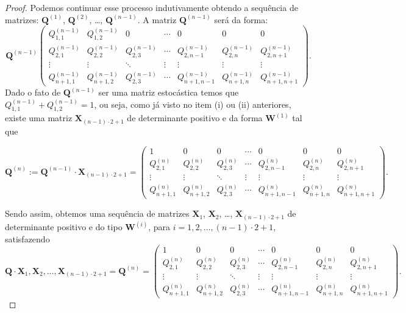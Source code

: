 \documentclass[twoside,openright,titlepage,numbers=noenddot,headinclude,  lineheaders footinclude=true,cleardoublepage=empty,
                                BCOR=5mm,paper=a4,fontsize=12pt ]{scrbook}
\theoremstyle{definition}
\begin{document}
\begin{proof}
Podemos continuar esse processo indutivamente obtendo a 
sequência de matrizes: $\mathbf{Q}^{(1)}$, $\mathbf{Q}^{(2)}$,
\ldots, $\mathbf{Q}^{(n-1)}$.
A matriz $\mathbf{Q}^{(n-1)}$ será da forma:
\[
\mathbf{Q}^{(n-1)}
\begin{pmatrix}
Q^{(n-1)}_{1,1} & Q^{(n-1)}_{1,2} &0 &  \cdots & 0 & 0&0\\
Q^{(n-1)}_{2,1} & Q^{(n-1)}_{2,2} &Q^{(n-1)}_{2,3} & \cdots &
 Q^{(n-1)}_{2,n-1}&
 Q^{(n-1)}_{2,n}&
Q^{(n-1)}_{2,n+1}\\
\vdots & \vdots & \ddots & \vdots & \vdots & \vdots & \vdots \\
Q^{(n-1)}_{n+1,1} & Q^{(n-1)}_{n+1,2} & Q^{(n-1)}_{2,3} & 
\cdots & Q^{(n-1)}_{n+1,n-1}&
 Q^{(n-1)}_{n+1,n} &
Q^{(n-1)}_{n+1,n+1}
\end{pmatrix}
.
\]
Dado o fato de $\mathbf{Q}^{(n-1)}$ ser uma matriz estocástica
temos que 
$Q_{1,1}^{(n-1)} + Q_{1, 2}^{(n-1)} = 1$, 
ou seja, como já visto no item (i) ou (ii) anteriores, existe
uma matriz $\mathbf{X}_{(n-1) \cdot 2  + 1}$ de determinante
positivo e da forma $\mathbf{W}^{(1)}$ tal que

\[
\mathbf{Q}^{(n)} := 
\mathbf{Q}^{(n-1)} \cdot \mathbf{X}_{(n-1) \cdot 2  + 1} =
\begin{pmatrix}
1 & 0 &0 &  \cdots & 0 & 0&0\\
Q^{(n)}_{2,1} & Q^{(n)}_{2,2} &Q^{(n)}_{2,3} & \cdots &
 Q^{(n)}_{2,n-1}&
 Q^{(n)}_{2,n}&
Q^{(n)}_{2,n+1}\\
\vdots & \vdots & \ddots & \vdots & \vdots & \vdots & \vdots \\
Q^{(n)}_{n+1,1} & Q^{(n)}_{n+1,2} & Q^{(n)}_{2,3} & 
\cdots & Q^{(n)}_{n+1,n-1}&
 Q^{(n)}_{n+1,n} &
Q^{(n)}_{n+1,n+1}
\end{pmatrix}
.
\]

Sendo assim, obtemos uma sequência de matrizes $\mathbf{X}_1$,
$\mathbf{X}_2$, \ldots, $\mathbf{X}_{(n-1) \cdot 2  + 1}$
de determinante positivo e do tipo $\mathbf{W}^{(i)}$,
para $i = 1, 2, \ldots, (n-1)\cdot 2 +1$, satisfazendo
\[
\mathbf{Q} \cdot \mathbf{X}_1,
\mathbf{X}_2, \ldots, \mathbf{X}_{(n-1) \cdot 2  + 1}=
\mathbf{Q}^{(n)} = 
\begin{pmatrix}
1 & 0 &0 &  \cdots & 0 & 0&0\\
Q^{(n)}_{2,1} & Q^{(n)}_{2,2} &Q^{(n)}_{2,3} & \cdots &
 Q^{(n)}_{2,n-1}&
 Q^{(n)}_{2,n}&
Q^{(n)}_{2,n+1}\\
\vdots & \vdots & \ddots & \vdots & \vdots & \vdots & \vdots \\
Q^{(n)}_{n+1,1} & Q^{(n)}_{n+1,2} & Q^{(n)}_{2,3} & 
\cdots & Q^{(n)}_{n+1,n-1}&
 Q^{(n)}_{n+1,n} &
Q^{(n)}_{n+1,n+1}
\end{pmatrix}
.
\]

\end{proof}
\end{document}
